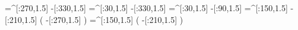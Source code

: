     =^[:270,1.5]%
     -[:330,1.5]%
     =^[:30,1.5]%
     -[:330,1.5]%
     =^[:30,1.5]%
      -[:90,1.5]%
    =^[:150,1.5]%
     -[:210,1.5]%
                   (
         -[:270,1.5]%
                   )
    =^[:150,1.5]%
                   (
         -[:210,1.5]%
                   )